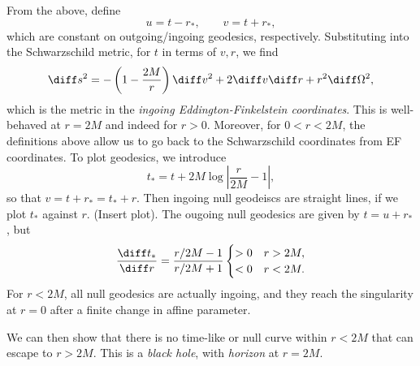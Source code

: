 \documentclass[12pt]{article}
\begin{document}
From the above, define
\[
u = t - r_\ast, \qquad v = t + r_\ast,
\]
which are constant on outgoing/ingoing geodesics, respectively. Substituting into the Schwarzschild metric, for $t$ in terms of $v, r$, we find
\[
\diff s^2 = - \left(1 - \frac{2M}{r} \right) \diff v^2 + 2 \diff v\diff r + r^2 \diff \Omega^2,
\]
which is the metric in the \emph{ingoing Eddington-Finkelstein coordinates}. This is well-behaved at $r = 2M$ and indeed for $r > 0$. Moreover, for $0 < r < 2M$, the definitions above allow us to go back to the Schwarzschild coordinates from EF coordinates. To plot geodesics, we introduce
\[
t_\ast = t + 2M \log \left| \frac{r}{2M} - 1 \right|,
\]
so that $v = t + r_\ast = t_\ast + r$. Then ingoing null geodeiscs are straight lines, if we plot $t_\ast$ against $r$. (Insert plot). The ougoing null geodesics are given by $t = u + r_\ast$, but
\[
\frac{\diff t_\ast}{\diff r} = \frac{r/2M - 1}{r/2M + 1}
\begin{cases}
	> 0 & r > 2M, \\
	< 0 & r < 2M.
\end{cases}
\]
For $r < 2M$, all null geodesics are actually ingoing, and they reach the singularity at $r = 0$ after a finite change in affine parameter.

We can then show that there is no time-like or null curve within $r < 2M$ that can escape to $r > 2M$. This is a \emph{black hole}, with \emph{horizon} at $r = 2M$.

\newpage

\printindex
\end{document}
